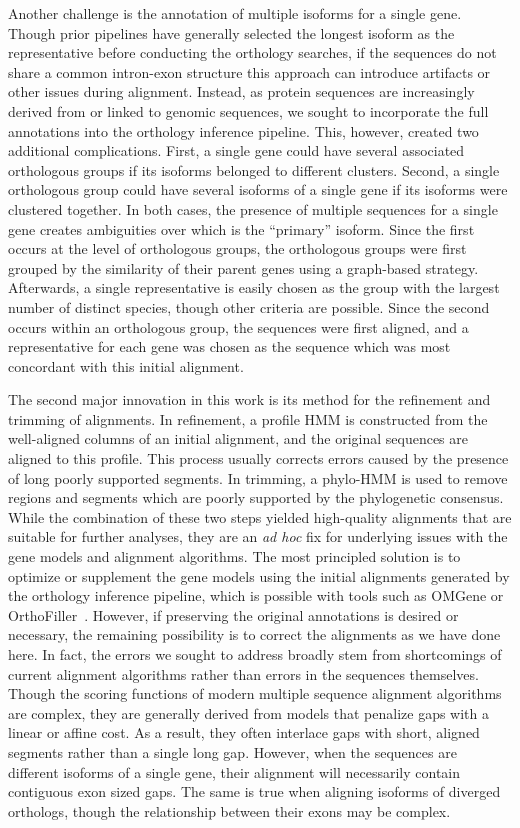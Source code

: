 Another challenge is the annotation of multiple isoforms for a single gene. Though prior pipelines have generally selected the longest isoform as the representative before conducting the orthology searches, if the sequences do not share a common intron-exon structure this approach can introduce artifacts or other issues during alignment. Instead, as protein sequences are increasingly derived from or linked to genomic sequences, we sought to incorporate the full annotations into the orthology inference pipeline. This, however, created two additional complications. First, a single gene could have several associated orthologous groups if its isoforms belonged to different clusters. Second, a single orthologous group could have several isoforms of a single gene if its isoforms were clustered together. In both cases, the presence of multiple sequences for a single gene creates ambiguities over which is the “primary” isoform. Since the first occurs at the level of orthologous groups, the orthologous groups were first grouped by the similarity of their parent genes using a graph-based strategy. Afterwards, a single representative is easily chosen as the group with the largest number of distinct species, though other criteria are possible. Since the second occurs within an orthologous group, the sequences were first aligned, and a representative for each gene was chosen as the sequence which was most concordant with this initial alignment.

The second major innovation in this work is its method for the refinement and trimming of alignments. In refinement, a profile HMM is constructed from the well-aligned columns of an initial alignment, and the original sequences are aligned to this profile. This process usually corrects errors caused by the presence of long poorly supported segments. In trimming, a phylo-HMM is used to remove regions and segments which are poorly supported by the phylogenetic consensus. While the combination of these two steps yielded high-quality alignments that are suitable for further analyses, they are an \textit{ad hoc} fix for underlying issues with the gene models and alignment algorithms. The most principled solution is to optimize or supplement the gene models using the initial alignments generated by the orthology inference pipeline, which is possible with tools such as OMGene or OrthoFiller~\cite{Dunne2018, Dunne2017}. However, if preserving the original annotations is desired or necessary, the remaining possibility is to correct the alignments as we have done here. In fact, the errors we sought to address broadly stem from shortcomings of current alignment algorithms rather than errors in the sequences themselves. Though the scoring functions of modern multiple sequence alignment algorithms are complex, they are generally derived from models that penalize gaps with a linear or affine cost. As a result, they often interlace gaps with short, aligned segments rather than a single long gap. However, when the sequences are different isoforms of a single gene, their alignment will necessarily contain contiguous exon sized gaps. The same is true when aligning isoforms of diverged orthologs, though the relationship between their exons may be complex.

